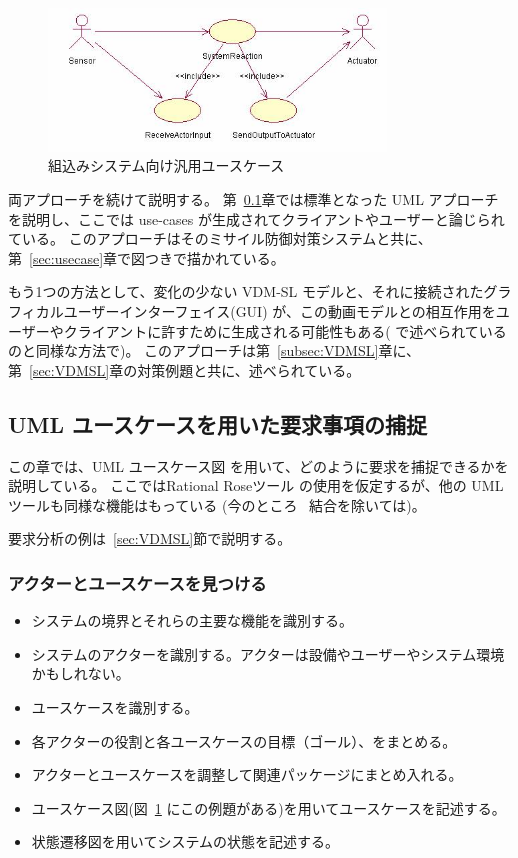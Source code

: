 \documentclass[\pformat,12pt]{jreport}
\begin{document}
\begin{figure}
\begin{center}
\includegraphics[width=0.8\textwidth]{generalusecase}
\end{center}
\caption{組込みシステム向け汎用ユースケース}\label{fig:usecase}
\end{figure}

両アプローチを続けて説明する。
第~\ref{subsec:capuse}章では標準となった UML \cite{UML20} アプローチを説明し、ここでは use-cases が生成されてクライアントやユーザーと論じられている。
このアプローチはそのミサイル防御対策システムと共に、第~\ref{sec:usecase}章で図つきで描かれている。

もう1つの方法として、変化の少ない VDM-SL モデルと、それに接続されたグラフィカルユーザーインターフェイス(GUI) が、この動画モデルとの相互作用をユーザーやクライアントに許すために生成される可能性もある( \cite{CashPoint}で述べられているのと同様な方法で)。
このアプローチは第~\ref{subsec:VDMSL}章に、第~\ref{sec:VDMSL}章の対策例題と共に、述べられている。

\subsection{UML ユースケースを用いた要求事項の捕捉}\label{subsec:capuse}

この章では、UML ユースケース図 \cite{UML20}を用いて、どのように要求を捕捉できるかを説明している。
ここではRational Roseツール \cite{Rose&00} の使用を仮定するが、他の UML ツールも同様な機能はもっている (今のところ \VDMTools\ 結合を除いては)。

要求分析の例は~\ref{sec:VDMSL}節で説明する。

\subsubsection{アクターとユースケースを見つける}

\begin{itemize}
\item システムの境界とそれらの主要な機能を識別する。
\item システムのアクターを識別する。アクターは設備やユーザーやシステム環境かもしれない。
\item ユースケースを識別する。
\item 各アクターの役割と各ユースケースの目標（ゴール）、をまとめる。
\item アクターとユースケースを調整して関連パッケージにまとめ入れる。
\item ユースケース図(図~\ref{fig:usecase} にこの例題がある)を用いてユースケースを記述する。
\item 状態遷移図を用いてシステムの状態を記述する。
\end{itemize}
\end{document}
